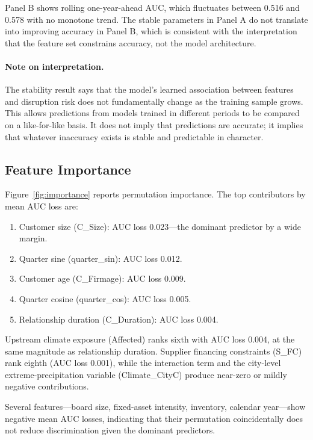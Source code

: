 \documentclass[12pt]{article}
\begin{document}
Panel B shows rolling one-year-ahead AUC, which fluctuates between 0.516
and 0.578 with no monotone trend.  The stable parameters in Panel A do
not translate into improving accuracy in Panel B, which is consistent with
the interpretation that the feature set constrains accuracy, not the model
architecture.

\paragraph{Note on interpretation.}
The stability result says that the model's learned association between
features and disruption risk does not fundamentally change as the training
sample grows.  This allows predictions from models trained in different
periods to be compared on a like-for-like basis.  It does not imply that
predictions are accurate; it implies that whatever inaccuracy exists is
stable and predictable in character.

\subsection{Feature Importance}

Figure~\ref{fig:importance} reports permutation importance.  The top
contributors by mean AUC loss are:
\begin{enumerate}
  \item Customer size (C\_Size): AUC loss 0.023---the dominant predictor
    by a wide margin.
  \item Quarter sine (quarter\_sin): AUC loss 0.012.
  \item Customer age (C\_Firmage): AUC loss 0.009.
  \item Quarter cosine (quarter\_cos): AUC loss 0.005.
  \item Relationship duration (C\_Duration): AUC loss 0.004.
\end{enumerate}

Upstream climate exposure (Affected) ranks sixth with AUC loss 0.004,
at the same magnitude as relationship duration.  Supplier financing
constraints (S\_FC) rank eighth (AUC loss 0.001), while the interaction
term and the city-level extreme-precipitation variable (Climate\_CityC)
produce near-zero or mildly negative contributions.

Several features---board size, fixed-asset intensity, inventory, calendar
year---show negative mean AUC losses, indicating that their permutation
coincidentally does not reduce discrimination given the dominant
predictors.
\end{document}
